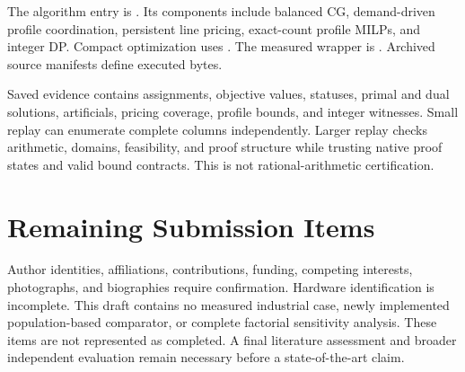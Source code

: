 \documentclass[letterpaper,journal]{IEEEtran}
\begin{document}
{\raggedright
The algorithm entry is . Its components include balanced CG, demand-driven profile coordination, persistent line pricing, exact-count profile MILPs, and integer DP. Compact optimization uses . The measured wrapper is . Archived source manifests define executed bytes.\par}

Saved evidence contains assignments, objective values, statuses, primal and dual solutions, artificials, pricing coverage, profile bounds, and integer witnesses. Small replay can enumerate complete columns independently. Larger replay checks arithmetic, domains, feasibility, and proof structure while trusting native proof states and valid bound contracts. This is not rational-arithmetic certification.

\section{Remaining Submission Items}
Author identities, affiliations, contributions, funding, competing interests, photographs, and biographies require confirmation. Hardware identification is incomplete. This draft contains no measured industrial case, newly implemented population-based comparator, or complete factorial sensitivity analysis. These items are not represented as completed. A final literature assessment and broader independent evaluation remain necessary before a state-of-the-art claim.
\end{document}
